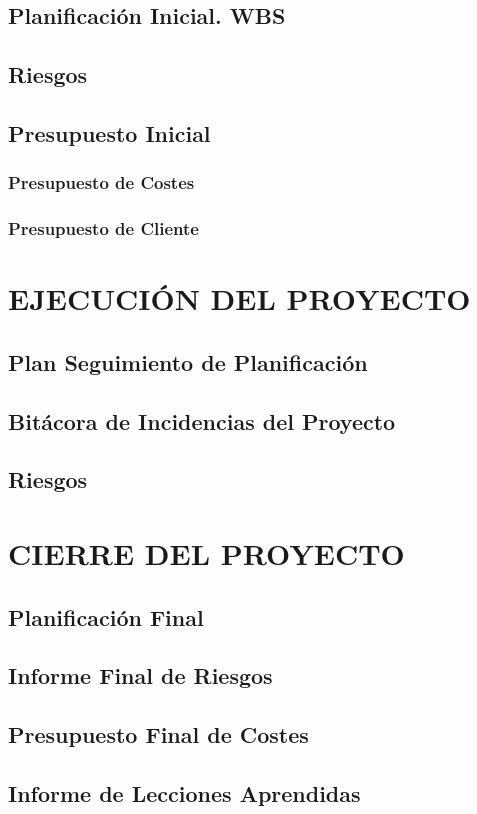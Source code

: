 \subsection{Planificación Inicial. WBS}



\subsection{Riesgos}





\subsection{Presupuesto Inicial}

\subsubsection{Presupuesto de Costes}

\subsubsection{Presupuesto de Cliente} 


\newpage
\section{EJECUCIÓN DEL PROYECTO}

\subsection{Plan Seguimiento de Planificación}

\subsection{Bitácora de Incidencias del Proyecto}

\subsection{Riesgos}


\newpage
\section{CIERRE DEL PROYECTO}

\subsection{Planificación Final}

\subsection{Informe Final de Riesgos}

\subsection{Presupuesto Final de Costes}



\subsection{Informe de Lecciones Aprendidas}

